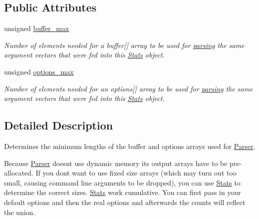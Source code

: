 \subsection*{Public Attributes}
\begin{DoxyCompactItemize}
\item 
unsigned \hyperlink{structxmem_1_1config_1_1third__party_1_1_stats_a42c3ec9a6baf2c24d783b00279266298}{buffer\+\_\+max}
\begin{DoxyCompactList}\small\item\em Number of elements needed for a {\ttfamily buffer}\mbox{[}\mbox{]} array to be used for \hyperlink{classxmem_1_1config_1_1third__party_1_1_parser_a0e45d97675bc5d003ef6f68ac8cd7249}{parsing} the same argument vectors that were fed into this \hyperlink{structxmem_1_1config_1_1third__party_1_1_stats}{Stats} object. \end{DoxyCompactList}\item 
unsigned \hyperlink{structxmem_1_1config_1_1third__party_1_1_stats_a74f645c06ae7eab5058f2a51226c2dcd}{options\+\_\+max}
\begin{DoxyCompactList}\small\item\em Number of elements needed for an {\ttfamily options}\mbox{[}\mbox{]} array to be used for \hyperlink{classxmem_1_1config_1_1third__party_1_1_parser_a0e45d97675bc5d003ef6f68ac8cd7249}{parsing} the same argument vectors that were fed into this \hyperlink{structxmem_1_1config_1_1third__party_1_1_stats}{Stats} object. \end{DoxyCompactList}\end{DoxyCompactItemize}


\subsection{Detailed Description}
Determines the minimum lengths of the buffer and options arrays used for \hyperlink{classxmem_1_1config_1_1third__party_1_1_parser}{Parser}. 

Because \hyperlink{classxmem_1_1config_1_1third__party_1_1_parser}{Parser} doesn\textquotesingle{}t use dynamic memory its output arrays have to be pre-\/allocated. If you don\textquotesingle{}t want to use fixed size arrays (which may turn out too small, causing command line arguments to be dropped), you can use \hyperlink{structxmem_1_1config_1_1third__party_1_1_stats}{Stats} to determine the correct sizes. \hyperlink{structxmem_1_1config_1_1third__party_1_1_stats}{Stats} work cumulative. You can first pass in your default options and then the real options and afterwards the counts will reflect the union. 

